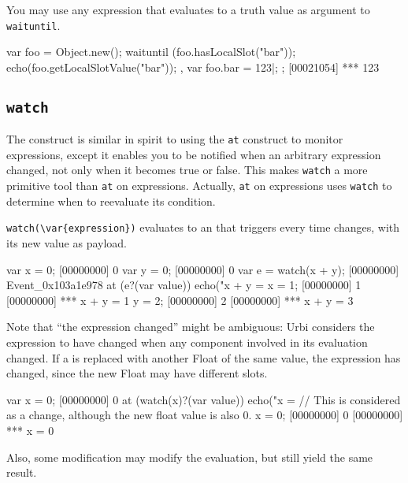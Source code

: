 You may use any expression that evaluates to a truth value as argument
to \lstinline{waituntil}.

\begin{urbiscript}
{
  var foo = Object.new();
  {
    waituntil (foo.hasLocalSlot("bar"));
    echo(foo.getLocalSlotValue("bar"));
  },
  var foo.bar = 123|;
};
[00021054] *** 123
\end{urbiscript}

\subsection{\lstinline{watch}}
\label{sec:lang:watch}


The  construct is similar in spirit to using the
\lstinline{at} construct to monitor expressions, except it enables you to be
notified when an arbitrary expression changed, not only when it becomes true
or false. This makes \lstinline{watch} a more primitive tool than
\lstinline{at} on expressions.  Actually, \lstinline{at} on expressions uses
\lstinline{watch} to determine when to reevaluate its condition.

\lstinline|watch(\var{expression})| evaluates to an  that
triggers every time  changes, with its new value as payload.

\begin{urbiscript}[firstnumber=1]
var x = 0;
[00000000] 0
var y = 0;
[00000000] 0
var e = watch(x + y);
[00000000] Event_0x103a1e978
at (e?(var value))
  echo("x + y = %
x = 1;
[00000000] 1
[00000000] *** x + y = 1
y = 2;
[00000000] 2
[00000000] *** x + y = 3
\end{urbiscript}

Note that ``the expression changed'' might be ambiguous: Urbi considers the
expression to have changed when any component involved in its evaluation
changed.  If a  is replaced with another Float of the same
value, the expression has changed, since the new Float may have different
slots.

\begin{urbiscript}[firstnumber=1]
var x = 0;
[00000000] 0
at (watch(x)?(var value))
  echo("x = %
// This is considered as a change, although the new float value is also 0.
x = 0;
[00000000] 0
[00000000] *** x = 0
\end{urbiscript}

Also, some modification may modify the evaluation, but still yield the same
result.

